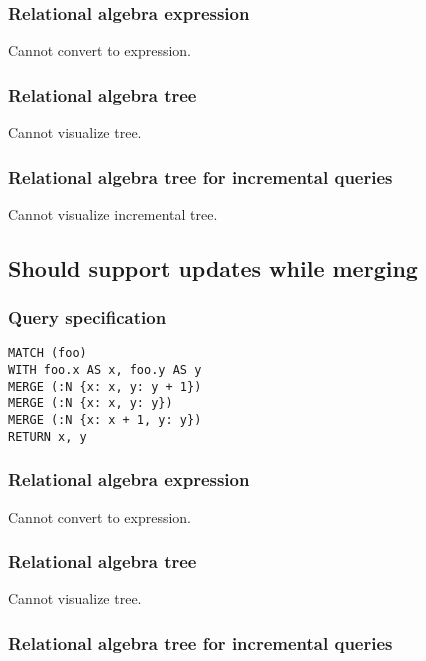 \subsubsection*{Relational algebra expression}

Cannot convert to expression.

\subsubsection*{Relational algebra tree}

Cannot visualize tree.

\subsubsection*{Relational algebra tree for incremental queries}

Cannot visualize incremental tree.

\subsection{Should support updates while merging}

\subsubsection*{Query specification}

\begin{lstlisting}
MATCH (foo)
WITH foo.x AS x, foo.y AS y
MERGE (:N {x: x, y: y + 1})
MERGE (:N {x: x, y: y})
MERGE (:N {x: x + 1, y: y})
RETURN x, y
\end{lstlisting}

\subsubsection*{Relational algebra expression}

Cannot convert to expression.

\subsubsection*{Relational algebra tree}

Cannot visualize tree.

\subsubsection*{Relational algebra tree for incremental queries}

